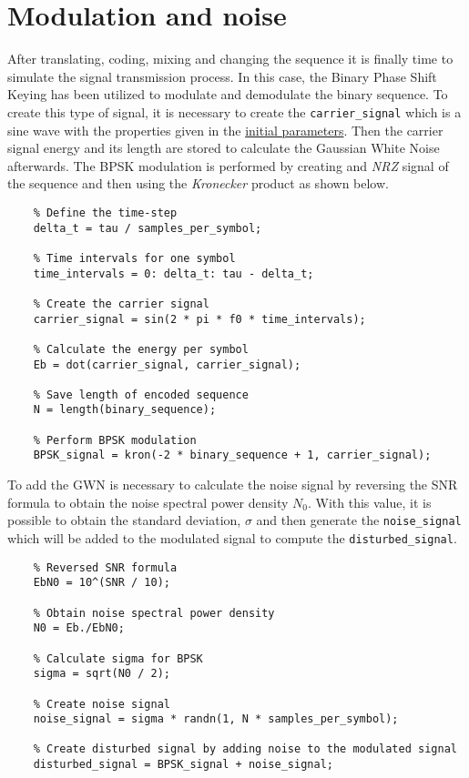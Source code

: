 \vspace{40px} \section{Modulation and noise}
After translating, coding, mixing and changing the sequence it is finally time to simulate the signal transmission process. In this case, the Binary Phase Shift Keying has been utilized to modulate and demodulate the binary sequence. To create this type of signal, it is necessary to create the \texttt{carrier\_signal} which is a sine wave with the properties given in the \hyperref[initial-parameters]{initial parameters}. Then the carrier signal energy and its length are stored to calculate the Gaussian White Noise afterwards. The BPSK modulation is performed by creating and \textsl{NRZ} signal of the sequence and then using the \textit{Kronecker} product as shown below.

\begin{lstlisting}
    % Define the time-step
    delta_t = tau / samples_per_symbol;
    
    % Time intervals for one symbol
    time_intervals = 0: delta_t: tau - delta_t;
    
    % Create the carrier signal
    carrier_signal = sin(2 * pi * f0 * time_intervals);
    
    % Calculate the energy per symbol
    Eb = dot(carrier_signal, carrier_signal);
    
    % Save length of encoded sequence
    N = length(binary_sequence);
    
    % Perform BPSK modulation
    BPSK_signal = kron(-2 * binary_sequence + 1, carrier_signal);

\end{lstlisting}

\noindent To add the GWN is necessary to calculate the noise signal by reversing the SNR formula to obtain the noise spectral power density $N_0$. With this value, it is possible to obtain the standard deviation, $\sigma$ and then generate the \texttt{noise\_signal} which will be added to the modulated signal to compute the \texttt{disturbed\_signal}.

\begin{lstlisting}
    % Reversed SNR formula
    EbN0 = 10^(SNR / 10);
    
    % Obtain noise spectral power density
    N0 = Eb./EbN0;
    
    % Calculate sigma for BPSK
    sigma = sqrt(N0 / 2);
    
    % Create noise signal
    noise_signal = sigma * randn(1, N * samples_per_symbol);
    
    % Create disturbed signal by adding noise to the modulated signal
    disturbed_signal = BPSK_signal + noise_signal;
\end{lstlisting}

